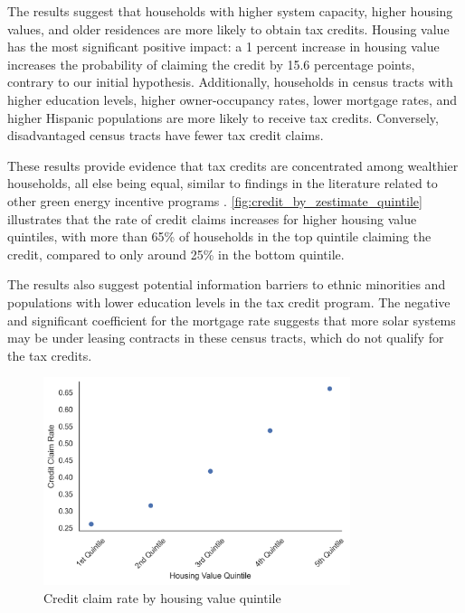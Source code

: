 \documentclass[11pt,twoside,letterpaper]{article}
\begin{document}
The results suggest that households with higher system capacity, higher housing values, and older residences are more likely to obtain tax credits. Housing value has the most significant positive impact: a 1 percent increase in housing value increases the probability of claiming the credit by 15.6 percentage points, contrary to our initial hypothesis. Additionally, households in census tracts with higher education levels, higher owner-occupancy rates, lower mortgage rates, and higher Hispanic populations are more likely to receive tax credits. Conversely, disadvantaged census tracts have fewer tax credit claims.

These results provide evidence that tax credits are concentrated among wealthier households, all else being equal, similar to findings in the literature related to other green energy incentive programs \parencite{borenstein_distributional_2016}. \autoref{fig:credit_by_zestimate_quintile} illustrates that the rate of credit claims increases for higher housing value quintiles, with more than 65\% of households in the top quintile claiming the credit, compared to only around 25\% in the bottom quintile. 

The results also suggest potential information barriers to ethnic minorities and populations with lower education levels in the tax credit program. The negative and significant coefficient for the mortgage rate suggests that more solar systems may be under leasing contracts in these census tracts, which do not qualify for the tax credits.

\begin{figure}[!ht]
    \centering
\includegraphics[width=0.8\textwidth]{figures/credit_by_zestimate_quintile.png}
    \caption{Credit claim rate by housing value quintile}
    \label{fig:credit_by_zestimate_quintile}
\end{figure}
\end{document}
